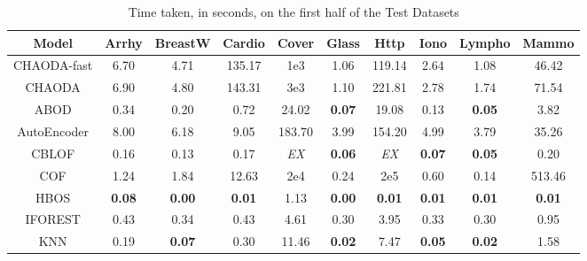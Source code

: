 \begin{table}[!t]
\renewcommand{\arraystretch}{1.15}
\caption{Time taken, in seconds, on the first half of the Test Datasets}
\label{supplement:table:results:test-time-1}
\vskip 0.15in
\begin{center}
\begin{small}
\begin{tabular}{|c|c|c|c|c|c|c|c|c|c|}
\hline
\textbf{Model} & \textbf{Arrhy} & \textbf{BreastW} & \textbf{Cardio} & \textbf{Cover} & \textbf{Glass} & \textbf{Http} & \textbf{Iono} & \textbf{Lympho} & \textbf{Mammo} \\
\hline
CHAODA-fast &                6.70 &             4.71 &          135.17 &        1e3 &           1.06 &        119.14 &                2.64 &            1.08 &          46.42 \\
\hline
CHAODA &                6.90 &             4.80 &          143.31 &        3e3 &           1.10 &        221.81 &                2.78 &            1.74 &          71.54 \\
\hline
ABOD &                0.34 &             0.20 &            0.72 &          24.02 &  \textbf{0.07} &         19.08 &                0.13 &   \textbf{0.05} &           3.82 \\
\hline
AutoEncoder &                8.00 &             6.18 &            9.05 &         183.70 &           3.99 &        154.20 &                4.99 &            3.79 &          35.26 \\
\hline
CBLOF &                0.16 &             0.13 &            0.17 &    \textit{EX} &  \textbf{0.06} &   \textit{EX} &       \textbf{0.07} &   \textbf{0.05} &           0.20 \\
\hline
COF &                1.24 &             1.84 &           12.63 &       2e4 &           0.24 &      2e5 &                0.60 &            0.14 &         513.46 \\
\hline
HBOS &       \textbf{0.08} &    \textbf{0.00} &   \textbf{0.01} &           1.13 &  \textbf{0.00} & \textbf{0.01} &       \textbf{0.01} &   \textbf{0.01} &  \textbf{0.01} \\
\hline
IFOREST &                0.43 &             0.34 &            0.43 &           4.61 &           0.30 &          3.95 &                0.33 &            0.30 &           0.95 \\
\hline
KNN &                0.19 &    \textbf{0.07} &            0.30 &          11.46 &  \textbf{0.02} &          7.47 &       \textbf{0.05} &   \textbf{0.02} &           1.58 \\

\end{tabular}
\end{small}
\end{center}
\end{table}
